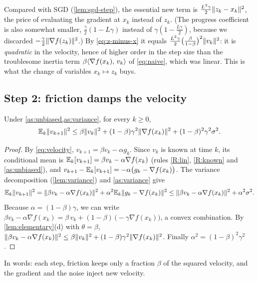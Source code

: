 Compared with SGD (\cref{lem:sgd-step}), the essential new term is
$\frac{L^2\gamma}{2}\lVert z_k-x_k\rVert^2$, the price of evaluating the gradient at $x_k$
instead of $z_k$. (The progress coefficient is also somewhat smaller,
$\frac\gamma2(1-L\gamma)$ instead of $\gamma(1-\frac{L\gamma}2)$, because we discarded
$-\frac\gamma2\lVert \nabla f(z_k)\rVert^2$.) By \eqref{eq:z-minus-x} it equals
$\frac{L^2\gamma}{2}\bigl(\frac{\beta}{1-\beta}\bigr)^2\lVert v_k\rVert^2$: it is
\emph{quadratic} in the velocity, hence of higher order in the step size than the
troublesome inertia term $\beta\langle \nabla f(x_k),\, v_k\rangle$ of \eqref{eq:naive}, which was
linear. This is what the change of variables $x_k\mapsto z_k$ buys.

\subsection{Step 2: friction damps the velocity}

\begin{lemma}\label{lem:velocity}
Under \cref{as:unbiased,as:variance}, for every $k\ge0$,
\begin{equation}\label{eq:velocity-bound}
  \mathbb{E}_k\lVert v_{k+1}\rVert^2\le\beta\lVert v_k\rVert^2+(1-\beta)\gamma^2\lVert \nabla f(x_k)\rVert^2+(1-\beta)^2\gamma^2\sigma^2 .
\end{equation}
\end{lemma}

\begin{proof}
By \eqref{eq:velocity}, $v_{k+1}=\beta v_k-\alpha g_k$. Since $v_k$ is known at time $k$,
its conditional mean is $\mathbb{E}_k[v_{k+1}]=\beta v_k-\alpha\nabla f(x_k)$ (rules \ref{R:lin},
\ref{R:known} and \cref{as:unbiased}), and $v_{k+1}-\mathbb{E}_k[v_{k+1}]=-\alpha\bigl(g_k-\nabla f(x_k)\bigr)$.
The variance decomposition (\cref{lem:variance}) and \cref{as:variance} give
\[
  \mathbb{E}_k\lVert v_{k+1}\rVert^2=\lVert \beta v_k-\alpha\nabla f(x_k)\rVert^2+\alpha^2\mathbb{E}_k\lVert g_k-\nabla f(x_k)\rVert^2
  \le\lVert \beta v_k-\alpha\nabla f(x_k)\rVert^2+\alpha^2\sigma^2 .
\]
Because $\alpha=(1-\beta)\gamma$, we can write
$\beta v_k-\alpha\nabla f(x_k)=\beta\,v_k+(1-\beta)\,\bigl(-\gamma\nabla f(x_k)\bigr)$, a convex
combination. By \cref{lem:elementary}(d) with $\theta=\beta$,
$\lVert \beta v_k-\alpha\nabla f(x_k)\rVert^2\le\beta\lVert v_k\rVert^2+(1-\beta)\gamma^2\lVert \nabla f(x_k)\rVert^2$.
Finally $\alpha^2=(1-\beta)^2\gamma^2$.
\end{proof}

In words: each step, friction keeps only a fraction $\beta$ of the squared velocity, and the
gradient and the noise inject new velocity.

